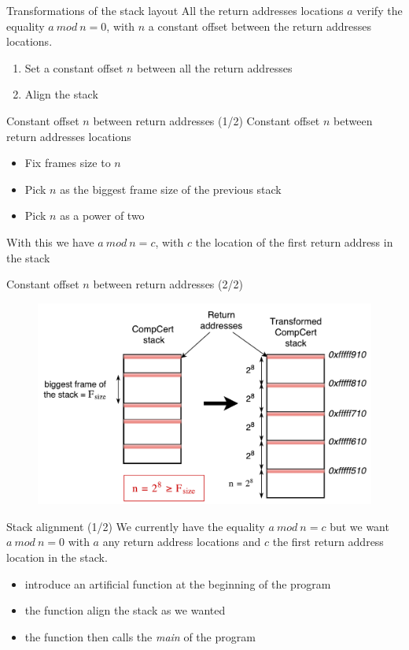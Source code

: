 \documentclass{beamer}
\begin{document}
\begin{frame}[c]{Transformations of the stack layout}
	All the return addresses locations $a$ verify the equality $a~mod~n=0$, with $n$ a constant offset between the return addresses locations.
	\begin{enumerate}
		\item Set a constant offset $n$ between all the return addresses
		\item Align the stack
	\end{enumerate}
\end{frame}

\begin{frame}[c]{Constant offset $n$ between return addresses (1/2)}
	Constant offset $n$ between return addresses locations
	\begin{itemize}
		\item Fix frames size to $n$
		\item Pick $n$ as the biggest frame size of the previous stack
		\item Pick $n$ as a power of two
	\end{itemize}
	With this we have $a~mod~n=c$, with $c$ the location of the first return address in the stack
\end{frame}

\begin{frame}[c]{Constant offset $n$ between return addresses (2/2)}
	\begin{figure}
	\centering
	\includegraphics[width=\textwidth]{images/stack_transform.pdf}
	\end{figure}
\end{frame}

\begin{frame}[c]{Stack alignment (1/2)}
	We currently have the equality $a~mod~n=c$ but we want $a~mod~n=0$ with $a$ any return address locations  and $c$ the first return address location in the stack.
	\begin{itemize}
		\item introduce an artificial function at the beginning of the program
		\item the function align the stack as we wanted
		\item the function then calls the \textit{main} of the program
	\end{itemize}
\end{frame}
\end{document}
